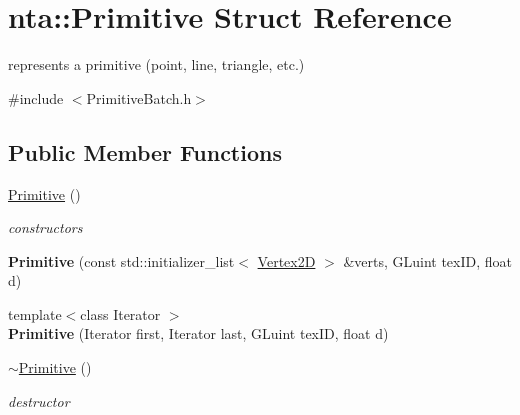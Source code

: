 \hypertarget{structnta_1_1Primitive}{}\section{nta\+:\+:Primitive Struct Reference}
\label{structnta_1_1Primitive}


represents a primitive (point, line, triangle, etc.)  




{\ttfamily \#include $<$Primitive\+Batch.\+h$>$}

\subsection*{Public Member Functions}
\begin{DoxyCompactItemize}
\item 
\mbox{\label{structnta_1_1Primitive_a457e15628dd6a138d27e41650040f5bf}} 
\hyperlink{structnta_1_1Primitive_a457e15628dd6a138d27e41650040f5bf}{Primitive} ()
\begin{DoxyCompactList}\small\item\em constructors \end{DoxyCompactList}\item 
\mbox{\label{structnta_1_1Primitive_ad8eb45115ed7647d71360ce6366eb2bc}} 
{\bfseries Primitive} (const std\+::initializer\+\_\+list$<$ \hyperlink{structnta_1_1Vertex2D}{Vertex2D} $>$ \&verts, G\+Luint tex\+ID, float d)
\item 
\mbox{\label{structnta_1_1Primitive_aa0325b0eb7dc6ec40294b9e47feb750b}} 
{\footnotesize template$<$class Iterator $>$ }\\{\bfseries Primitive} (Iterator first, Iterator last, G\+Luint tex\+ID, float d)
\item 
\mbox{\label{structnta_1_1Primitive_a39fbab541466b58744a8c7a0aa4eb49c}} 
\hyperlink{structnta_1_1Primitive_a39fbab541466b58744a8c7a0aa4eb49c}{$\sim$\+Primitive} ()
\begin{DoxyCompactList}\small\item\em destructor \end{DoxyCompactList}\end{DoxyCompactItemize}
